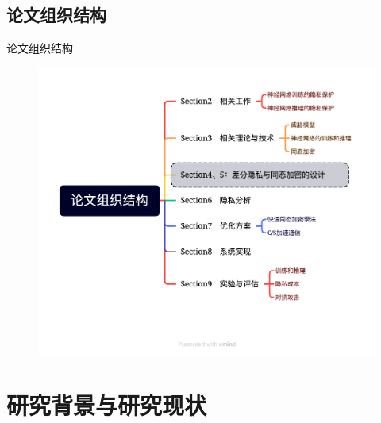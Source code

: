 \documentclass{beamer}
\begin{document}
\subsection{论文组织结构}
\begin{frame}{论文组织结构}
	\begin{figure}[h]
    	\centering
        \includegraphics[height=.9\textheight]{pic/structure.png}
    \end{figure} 
\end{frame}


\section{研究背景与研究现状}
\end{document}
